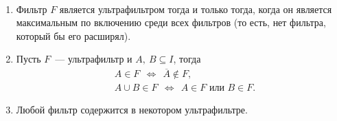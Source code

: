 \begin{stat} \ \vspace{-4mm}
    \begin{enumerate}
        \item \label{ultraStatA} Фильтр $F$ является ультрафильтром тогда и только тогда, когда он является максимальным по включению среди всех фильтров (то есть, нет фильтра, который бы его расширял). 
        \item \label{ultraStatB} Пусть $F$~— ультрафильтр и $A, \: B \subseteq I$, тогда
		\begin{align*}
		   & A \in F\ \ \Longleftrightarrow\ \ \overline{A} \notin F, \\
		   & A \cup B \in F\ \ \Longleftrightarrow\ \ A \in F\text{ или }B \in F.
		\end{align*}
        \item \label{ultraStatC} Любой фильтр содержится в некотором ультрафильтре.
    \end{enumerate}
\end{stat}

